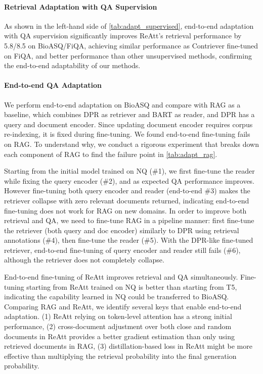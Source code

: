 \documentclass[11pt, dvipsnames]{article}
\newcommand{\ours}{ReAtt\xspace}
\newcommand{\adjustment}{cross-document adjustment\xspace}
\begin{document}
\paragraph{Retrieval Adaptation with QA Supervision}
As shown in the left-hand side of \autoref{tab:adapt_supervised}, end-to-end adaptation with QA supervision significantly improves \ours's retrieval performance by 5.8/8.5 on BioASQ/FiQA, achieving similar performance as Contriever fine-tuned on FiQA, and better performance than other unsupervised methods, confirming the end-to-end adaptability of our methods.

\paragraph{End-to-end QA Adaptation}
We perform end-to-end adaptation on BioASQ and compare with RAG as a baseline, which combines DPR as retriever and BART as reader, and DPR has a query and document encoder.
Since updating document encoder requires corpus re-indexing, it is fixed during fine-tuning.
We found end-to-end fine-tuning fails on RAG.
To understand why, we conduct a rigorous experiment that breaks down each component of RAG to find the failure point in \autoref{tab:adapt_rag}.

Starting from the initial model trained on NQ (\#1), we first fine-tune the reader while fixing the query encoder (\#2), and as expected QA performance improves.
However fine-tuning both query encoder and reader (end-to-end \#3) makes the retriever collapse with zero relevant documents returned, indicating end-to-end fine-tuning does not work for RAG on new domains.
In order to improve both retrieval and QA, we need to fine-tune RAG in a pipeline manner: first fine-tune the retriever (both query and doc encoder) similarly to DPR using retrieval annotations (\#4), then fine-tune the reader (\#5).
With the DPR-like fine-tuned retriever, end-to-end fine-tuning of query encoder and reader still fails (\#6), although the retriever does not completely collapse.

End-to-end fine-tuning of \ours improves retrieval and QA simultaneously.
Fine-tuning starting from \ours trained on NQ is better than starting from T5, indicating the capability learned in NQ could be transferred to BioASQ.
Comparing RAG and \ours, we identify several keys that enable end-to-end adaptation.
(1) \ours relying on token-level attention has a strong initial performance, (2) \adjustment over both close and random documents in \ours provides a better gradient estimation than only using retrieved documents in RAG, (3) distillation-based loss in \ours might be more effective than multiplying the retrieval probability into the final generation probability.
\end{document}
